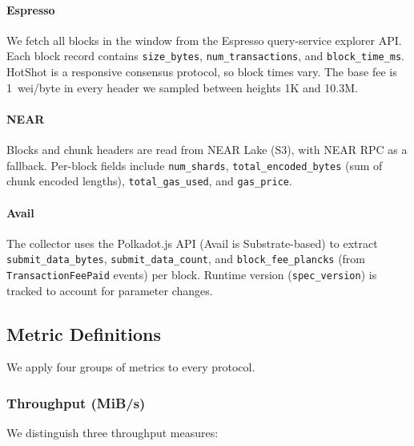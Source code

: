\paragraph{Espresso}
We fetch all blocks in the window from the Espresso query-service explorer API.
Each block record contains \texttt{size\_bytes}, \texttt{num\_transactions}, and \texttt{block\_time\_ms}.
HotShot is a responsive consensus protocol, so block times vary.
The base fee is 1~wei/byte in every header we sampled between heights 1K and 10.3M.

\paragraph{NEAR}
Blocks and chunk headers are read from NEAR Lake (S3), with NEAR RPC as a fallback.
Per-block fields include \texttt{num\_shards}, \texttt{total\_encoded\_bytes} (sum of chunk encoded lengths), \texttt{total\_gas\_used}, and \texttt{gas\_price}.

\paragraph{Avail}
The collector uses the Polkadot.js API (Avail is Substrate-based) to extract \texttt{submit\_data\_bytes}, \texttt{submit\_data\_count}, and \texttt{block\_fee\_plancks} (from \texttt{TransactionFeePaid} events) per block.
Runtime version (\texttt{spec\_version}) is tracked to account for parameter changes.

\subsection{Metric Definitions}
\label{sec:meth-metrics}

We apply four groups of metrics to every protocol.

\subsubsection{Throughput (MiB/s)}

We distinguish three throughput measures:


